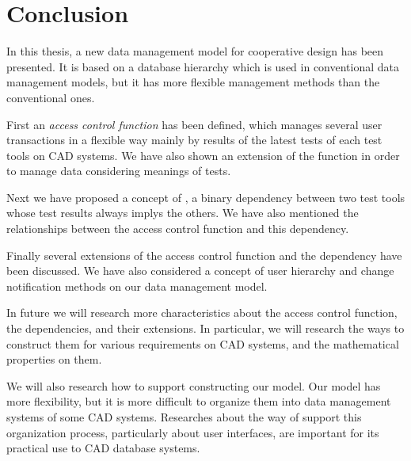 \section{Conclusion}
\label{sec:conclu}
In this thesis, a new data management model for cooperative
design has been presented.
It is based on a database hierarchy which is used in conventional data
management models, but it has more flexible management methods than the
conventional ones.

First an {\em access control function} has been defined, which manages several
user transactions in a flexible way mainly by results of the latest
tests of each test tools on CAD systems.
We have also shown an extension of the function in order to manage data
considering meanings of tests.

Next we have proposed a concept of , a binary
dependency between two test tools whose test results always implys the
others.
We have also mentioned the relationships between the access control function
and this dependency.

Finally several extensions of the access control function
and the \testtool dependency have been discussed.
We have also considered a concept of user hierarchy and change notification
methods on our data management model.

In future we will research more characteristics about the access control
function, the \testtool dependencies, and their extensions.
In particular, we will research the ways to construct them for various 
requirements on CAD systems, and the mathematical properties on them.

We will also research how to support constructing our model.
Our model has more flexibility, but it is more difficult to organize
them into data management systems of some CAD systems.
Researches about the way of support this organization process, 
particularly about user interfaces, are important for its practical use
to CAD database systems.
